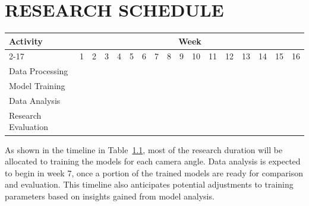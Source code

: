 \chapter{RESEARCH SCHEDULE}

\newcommand{\w}{}
\newcommand{\G}{\cellcolor{gray}}
\begin{table}[H]
  \label{tbl:timeline}
  \begin{tabular}{|p{3.5cm}|c|c|c|c|c|c|c|c|c|c|c|c|c|c|c|c|}

    \hline
    \multirow{2}{*}{Activity} & \multicolumn{16}{|c|}{Week}                                                                       \\
    \cline{2-17}              &
    1                         & 2                             & 3  & 4  & 5  & 6  & 7  & 8  & 9  & 10 & 11 & 12 & 13 & 14 & 15 & 16 \\
    \hline

    Data Processing           &
    \G                        & \G                            & \w & \w & \w & \w & \w & \w & \w & \w & \w & \w & \w & \w & \w & \w \\
    \hline

    Model Training            &
    \w                        & \w                            & \G & \G & \G & \G & \G & \G & \G & \G & \G & \w & \w & \w & \w & \w \\
    \hline

    Data Analysis             &
    \w                        & \w                            & \w & \w & \w & \w & \G & \G & \G & \G & \G & \G & \w & \w & \w & \w \\
    \hline

    Research Evaluation       &
    \w                        & \w                            & \w & \w & \w & \w & \w & \w & \w & \w & \G & \G & \G & \G & \G & \G \\
    \hline
  \end{tabular}
\end{table}

As shown in the timeline in Table~\ref{tbl:timeline}, most of the research duration will be allocated to training the models for each camera angle. Data analysis is expected to begin in week 7, once a portion of the trained models are ready for comparison and evaluation. This timeline also anticipates potential adjustments to training parameters based on insights gained from model analysis.
